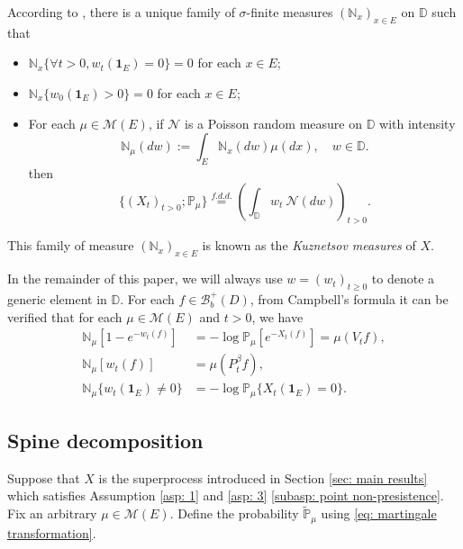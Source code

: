 \documentclass[12pt,a4paper]{amsart}
\theoremstyle{plain}
\theoremstyle{definition}
\numberwithin{equation}{section}
\begin{document}
	According to \cite[Section 8.4]{Li2011Measure-valued}, there is a unique family of $\sigma$-finite measures $(\mathbb N_x)_{x\in E}$ on $\mathbb D$ such that
\begin{itemize}
\item
    $\mathbb N_x \{\forall t > 0, w_t(\mathbf 1_E)=0\} =0$ for each $x\in E$;
\item
    $\mathbb N_x \{ w_0(\mathbf 1_E) > 0\} = 0$ for each $x\in E$;
\item
    For each $\mu \in \mathcal M(E)$, if $\mathcal N$ is a Poisson random measure on $\mathbb D$ with intensity
\[
	\mathbb N_\mu(dw):= \int_E \mathbb N_x(dw)\mu(dx), \quad w\in \mathbb D.
\]
	then
\[
	\{(X_t)_{t> 0};\mathbb P_\mu\}
	\overset{f.d.d.}{=} \left(\int_{\mathbb D} w_t~\mathcal N(dw)\right)_{t> 0}.
\]
\end{itemize}
	This family of measure $(\mathbb N_x)_{x\in E}$ is known as the \emph{Kuznetsov measures} of $X$.


	In the remainder of this paper, we will always use $w = (w_t)_{t\geq 0}$ to denote a generic element in $\mathbb D$.
	For each $f\in \mathcal B_b^+(D)$, from Campbell's formula it can be verified that for each $\mu\in \mathcal M(E)$ and $t>0$, we have
\begin{align}\label{eq: kuznetsov Laplace}
 	\mathbb N_\mu[1-e^{-w_t(f) }]
 	&=-\log \mathbb P_\mu[e^{-X_t(f)}] 
 	= \mu(V_t f),
 	\\ \mathbb N_\mu[w_t(f)]
 	&=\mu(P_t^{\beta}f),
 	\\\mathbb N_\mu\{w_t(\mathbf 1_E) \neq 0\}
 	&=-\log\mathbb P_\mu\{X_t(\mathbf 1_E) = 0\}.
\end{align}


\subsection{Spine decomposition}
Suppose that $X$ is the superprocess introduced in Section \ref{sec: main
  results} which satisfies Assumption \ref{asp: 1} and \ref{asp: 3}
\eqref{subasp: point non-presistence}. Fix an arbitrary $\mu\in \mathcal M(E)$.
Define the probability $\widetilde {\mathbb P}_\mu$ using \eqref{eq: martingale
  transformation}.
\end{document}
